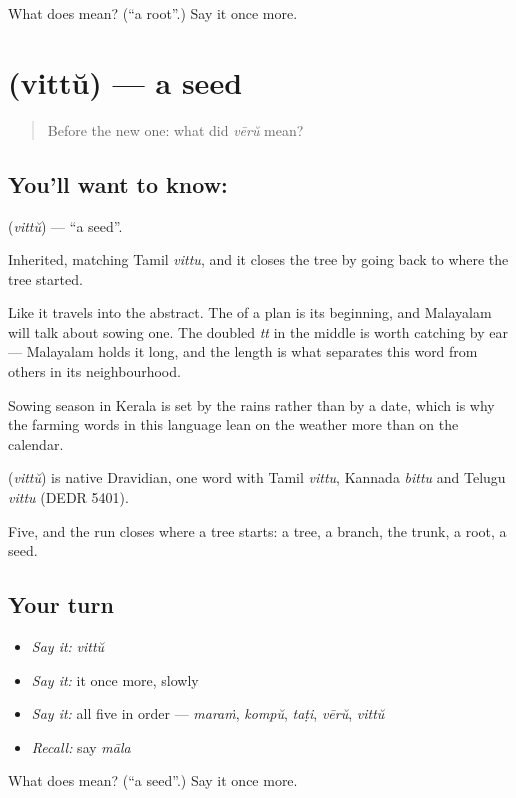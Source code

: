\begin{tcolorbox}[breakable,colback=teal!4,colframe=teal!35!black,title={Before you move on}]
What does  mean? (\textquotedblleft{}a root\textquotedblright{}.) Say it once more.
\end{tcolorbox}
\section[\texorpdfstring{\ml{വിത്ത്} (vittŭ)}{വിത്ത് (vittŭ)}]{ (vittŭ) — a seed}

\label{lesson:ML-C54-seed}



\begin{quote}
Before the new one: what did \emph{vērŭ} mean?
\end{quote}

\subsection*{You'll want to know: }
\textbf{} (\emph{vittŭ}) — \textquotedblleft{}a seed\textquotedblright{}.

Inherited, matching Tamil \emph{vittu}, and it closes the tree by going back to where the tree started.

Like  it travels into the abstract. The  of a plan is its beginning, and Malayalam will talk about sowing one. The doubled \emph{tt} in the middle is worth catching by ear — Malayalam holds it long, and the length is what separates this word from others in its neighbourhood.

Sowing season in Kerala is set by the rains rather than by a date, which is why the farming words in this language lean on the weather more than on the calendar.

\begin{cousinweb}
\textbf{} (\emph{vittŭ}) is native Dravidian, one word with Tamil \emph{vittu}, Kannada \emph{bittu} and Telugu \emph{vittu} (DEDR 5401).
\end{cousinweb}

\begin{grammarlens}[title={What you've built}]
Five, and the run closes where a tree starts: a tree, a branch, the trunk, a root, a seed.
\end{grammarlens}

\subsection*{Your turn}
\begin{itemize}
\raggedright
  \item \emph{Say it:} \emph{vittŭ}
  \item \emph{Say it:} it once more, slowly
  \item \emph{Say it:} all five in order — \emph{maraṁ}, \emph{kompŭ}, \emph{taṭi}, \emph{vērŭ}, \emph{vittŭ}
  \item \emph{Recall:} say \emph{māla}
\end{itemize}

\begin{tcolorbox}[breakable,colback=teal!4,colframe=teal!35!black,title={Before you move on}]
What does  mean? (\textquotedblleft{}a seed\textquotedblright{}.) Say it once more.
\end{tcolorbox}
